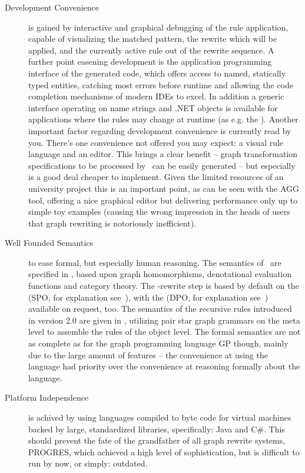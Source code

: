 \begin{description}
\item[Development Convenience]
is gained by interactive and graphical debugging of the rule application, capable of visualizing the matched pattern, the rewrite which will be applied, and the currently active rule out of the rewrite sequence.
A further point easening development is the application programming interface of the generated code,
which offers access to named, statically typed entities, catching most errors before runtime and allowing the code completion mechanisms of modern IDEs to excel.
In addition a generic interface operating on name strings and .NET objects is available for applications where the rules may change at runtime (as e.g. the \GrShell).
Another important factor regarding development convenience is currently read by you.
There's one convenience not offered you may expect: a visual rule language and an editor.
This brings a clear benefit -- graph transformation specifications to be processed by \GrG\ can be easily generated --
but especially is a good deal cheaper to implement. Given the limited resources of an university project this is an important point,
as can be seen with the AGG\cite{agg} tool, offering a nice graphical editor but delivering performance only up to simple toy examples 
(causing the wrong impression in the heads of users that graph rewriting is notoriously inefficient).

\item[Well Founded Semantics]
to ease formal, but especially human reasoning.
The semantics of \GrG\ are specified in \cite{DissRuby}, based upon graph homomorphisms, denotational evaluation functions and category theory.
The \GrG-rewrite step is based by default on the  (SPO, for explanation see~\cite{spoapproach}),
with the  (DPO, for explanation see~\cite{dpoapproach}) available on request, too.
The semantics of the recursive rules introduced in version 2.0 are given in \cite{Jak:08},
utilizing pair star graph grammars on the meta level to assemble the rules of the object level.
The formal semantics are not as complete as for the graph programming language GP\cite{gp} though, mainly due to the large amount of features 
-- the convenience at using the language had priority over the convenience at reasoning formally about the language.

\item[Platform Independence]
is achived by using languages compiled to byte code for virtual machines backed by large, standardized libraries, specifically: Java and C\#.
This should prevent the fate of the grandfather of all graph rewrite systems, PROGRES\cite{schuerr99progres},
which achieved a high level of sophistication, but is difficult to run by now, or simply: outdated.


\end{description}
